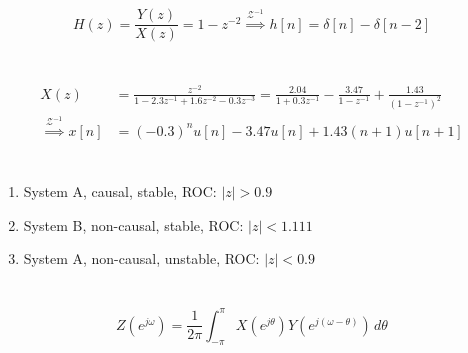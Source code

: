 \documentclass{article}
\begin{document}
\subsection{}

\begin{equation}
    H(z) = \frac{Y(z)}{X(z)} = 1 - z^{-2} \overset{\mathcal{Z}^{-1}}{\implies} h[n] = \delta[n] - \delta[n - 2]
\end{equation}

\newpage
\section{}

\begin{align}
    X(z) &= \frac{z^{-2}}{1 - 2.3z^{-1} + 1.6z^{-2} - 0.3z^{-3}} = \frac{2.04}{1 + 0.3z^{-1}} - \frac{3.47}{1 - z^{-1}} + \frac{1.43}{(1 - z^{-1})^2} \\
    \overset{\mathcal{Z}^{-1}}{\implies} x[n] &= (-0.3)^n u[n] - 3.47 u[n] + 1.43 (n + 1) u[n + 1]
\end{align}

\newpage
\section{}

\begin{enumerate}
    \item System A, causal, stable, ROC: \(|z| > 0.9\)
    \item System B, non-causal, stable, ROC: \(|z| < 1.111\)
    \item System A, non-causal, unstable, ROC: \(|z| < 0.9\)
\end{enumerate}

\newpage
\section{}

\begin{equation}
    Z(e^{j \omega}) = \frac{1}{2\pi} \int_{-\pi}^\pi X(e^{j \theta}) Y(e^{j (\omega - \theta)}) \, d\theta
\end{equation}

\subsection{}
\end{document}
